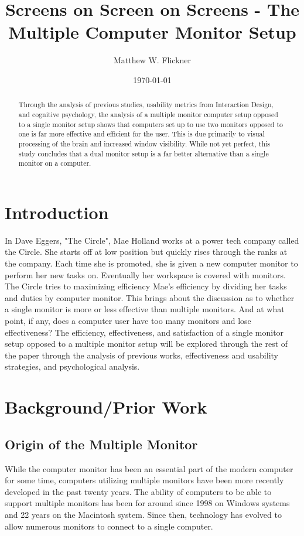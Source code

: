 \documentclass[a4paper]{article}
\title{Screens on Screen on Screens - The Multiple Computer Monitor Setup}
\author{Matthew W. Flickner}
\date{\today}
\begin{document}
\maketitle

\begin{abstract}
Through the analysis of previous studies, usability metrics from Interaction Design, and cognitive psychology, the analysis of a multiple monitor computer setup opposed to a single monitor setup shows that computers set up to use two monitors opposed to one is far more effective and efficient for the user. This is due primarily to visual processing of the brain and increased window visibility. While not yet perfect, this study concludes that a dual monitor setup is a far better alternative than a single monitor on a computer.
\end{abstract}

\section{Introduction}
In Dave Eggers, "The Circle", Mae Holland works at a power tech company called the Circle. She starts off at low position but quickly rises through the ranks at the company. Each time she is promoted, she is given a new computer monitor to perform her new tasks on. Eventually her workspace is covered with monitors. The Circle tries to maximizing efficiency Mae's efficiency by dividing her tasks and duties by computer monitor. This brings about the discussion as to whether a single monitor is more or less effective than multiple monitors. And at what point, if any, does a computer user have too many monitors and lose effectiveness? The efficiency, effectiveness, and satisfaction of a single monitor setup opposed to a multiple monitor setup will be explored through the rest of the paper through the analysis of previous works, effectiveness and usability strategies, and psychological analysis.

\section{Background/Prior Work}
\subsection{Origin of the Multiple Monitor}
While the computer monitor has been an essential part of the modern computer for some time, computers utilizing multiple monitors have been more recently developed in the past twenty years. The ability of computers to be able to support multiple monitors has been for around since 1998 on Windows systems and 22 years on the Macintosh system.\cite{Grudin}  Since then, technology has evolved to allow numerous monitors to connect to a single computer.
\end{document}
